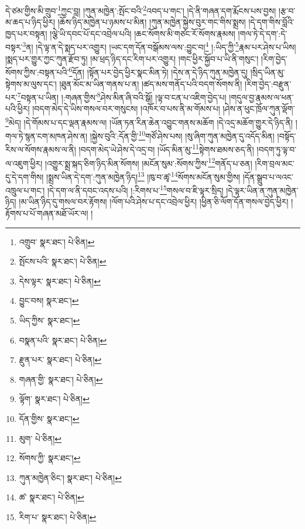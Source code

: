 དེ་ཙམ་གྱིས་མི་གྲུབ་\footnote{འགྲུབ་  སྣར་ཐང་།  པེ་ཅིན། }ཀྱང་བླ། །ཀུན་མཁྱེན་:སྤོང་བའི་\footnote{སྤོངས་པའི་  སྣར་ཐང་།  པེ་ཅིན། }འབད་པ་གང་། །དེ་ནི་གཞན་དག་རྨོངས་པས་བྱས། །རྩ་བ་མ་ཆད་པ་ཉིད་ཕྱིར། །ཆོས་ཉིད་མཁྱེན་པ་ཉམས་པ་མིན། །ཀུན་མཁྱེན་སྐྱེས་བུར་གང་གིས་སྨྲས། །དེ་དག་གིས་བློའི་ཁྱད་པར་བསྟན། །ལྕེ་ཡི་དབང་པོ་དང་འབྲེལ་པའི། །ཆང་སོགས་མི་གཙང་རོ་སོགས་རྣམས། །གལ་ཏེ་དེ་དག་:དེ་བསྟར་\footnote{དེས་ལྟར་  སྣར་ཐང་།  པེ་ཅིན། }ན། །དེ་ལྟ་ན་དེ་སྨད་པར་འགྱུར། །ཡང་དག་དོན་བསྒོམས་ལས་:བྱུང་བ།\footnote{བྱུང་བས།  སྣར་ཐང་། } །:ཡིད་ཀྱི་\footnote{ཡིད་ཀྱིས་  སྣར་ཐང་། }རྣམ་པར་ཤེས་པ་ཡིས། །སྨད་པར་གྱུར་ཀྱང་ཀུན་རྫོབ་ཏུ། །མ་ཕྲད་ཉིད་དང་རིག་པར་འགྱུར། །གང་ཕྱིར་སྐྱོབ་པ་ཡི་ནི་གསུང་། །རིག་བྱེད་སོགས་ཀྱིས་:བསྟན་པའི་\footnote{བསྣན་པའི་  སྣར་ཐང་།  པེ་ཅིན། }དོན། །སྟོན་པར་བྱེད་ཕྱིར་སྣང་མིན་ཏེ། །དེས་ན་དེ་ཉིད་ཀུན་མཁྱེན་དུ། །སྲིད་ཡིན་མུ་སྟེགས་མ་ལུས་དང་། །ཐུན་མོང་མ་ཡིན་གནས་པ་ན། །ཚད་མས་གནོད་པའི་བདག་སོགས་ནི། །རིག་བྱེད་:བརྫུན་པར་\footnote{རྫུན་པར་  སྣར་ཐང་།  པེ་ཅིན། }བསྟན་པ་ཡིན། །:གཞན་གྱིས་\footnote{གཞན་གྱི་  སྣར་ཐང་།  པེ་ཅིན། }ཤེས་མིན་ཞི་བའི་སྒོ། །ལྟ་བ་ངན་པ་འཇིག་བྱེད་པ། །གདུལ་བྱ་རྣམས་ལ་ཕན་པའི་ཕྱིར། །བདག་མེད་དེ་ཡིས་གསལ་བར་གསུངས། །འཁོར་བ་པས་ནི་མ་གོམས་པ། །ཤེས་ན་ཕུང་ཁྲོལ་ཀུན་ལྡོག་\footnote{ལྟོག་  སྣར་ཐང་།  པེ་ཅིན། }མེད། །དེ་གོམས་པ་དང་ལྡན་རྣམས་ལ། །ཡོན་ཏན་རིན་ཆེན་འབྱུང་གནས་མཆོག །དེ་འདྲ་མཆོག་གྱུར་དེ་ཉིད་ནི། །གལ་ཏེ་སྙན་ངག་མཁན་ཤེས་ན། །སྐྱེས་བུའི་:དོན་གྱི་\footnote{དོན་གྱིས་  སྣར་ཐང་། }གཙོ་ཤེས་པས། །སུ་ཞིག་ཀུན་མཁྱེན་དུ་འདོད་མིན། །བསྟོད་རིས་ལ་སོགས་རྣམས་ལ་ནི། །བདག་མེད་ཡེ་ཤེས་དེ་འདྲ་བ། །ཡོད་མིན་མུ་\footnote{མུག་  པེ་ཅིན། }སྟེགས་ཐམས་ཅད་ནི། །བདག་ཏུ་ལྟ་བ་ལ་འཇུག་ཕྱིར། །འགྱུར་སྨྲ་སྐད་ཅིག་ཉིད་མིན་སོགས། །མངོན་སུམ་:སོགས་ཀྱིས་\footnote{སོགས་ཀྱི་  སྣར་ཐང་། }གནོད་པ་ཅན། །རིག་བྲལ་མང་དུ་དེ་དག་གིས། །སྨྲས་ཡིན་དེ་དག་:ཀུན་མཁྱེན་ཉིད།\footnote{ཀུན་མཁྱེན་ཅིང་།  སྣར་ཐང་།  པེ་ཅིན། } །ཁུ་བ་ཚྭ་\footnote{ཚ་  སྣར་ཐང་།  པེ་ཅིན། }སོགས་མངོན་སུམ་གྱིས། །དོན་སྒྲུབ་པ་ལའང་འཁྲུལ་པ་གང་། །དེ་དག་ལ་ནི་དབང་འདས་པའི། །:རིགས་པ་\footnote{རིག་པ་  སྣར་ཐང་།  པེ་ཅིན། }གསལ་བ་ཇི་ལྟར་སྲིད། །དེ་ལྟར་ཡིན་ན་ཀུན་མཁྱེན་ཉིད། །མ་ཡིན་ཉིད་དུ་གསལ་བར་རྟོགས། །ལོག་པའི་ཤེས་པ་དང་འབྲེལ་ཕྱིར། །ཕྱིན་ཅི་ལོག་དོན་གསལ་བྱེད་ཕྱིར། །རྟོགས་པ་པོ་གཞན་མཐོ་ཡོར་ལ། །
